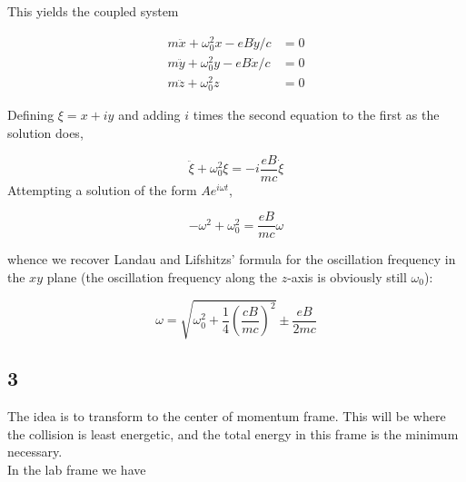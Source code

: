 \documentclass[12pt]{article}
\begin{document}
\noindent This yields the coupled system

\begin{align*}
m\ddot{x} + \omega_0^2x - eB\dot{y}/c &= 0 \\
m\ddot{y} + \omega_0^2y - eB\dot{x}/c &= 0 \\
m\ddot{z} + \omega_0^2z &= 0
\end{align*}

\noindent Defining \(\xi = x + iy\) and adding \(i\) times the second equation to the first as the solution does,

\[\ddot{\xi}+\omega_0^2\xi = -i\frac{eB}{mc}\dot{\xi}
\] 
\noindent Attempting a solution of the form \( Ae^{i\omega t}\),

\[-\omega^2 + \omega_0^2 = \frac{eB}{mc}\omega
\]

\noindent whence we recover Landau and Lifshitzs' formula for the oscillation frequency in the \(xy\) plane (the oscillation frequency along the \(z\)-axis is obviously still \(\omega_0\)):

\[\omega = \sqrt{\omega_0^2 +\frac{1}{4}\left(\frac{cB}{mc}\right)^2} \pm \frac{eB}{2mc}
\]

\pagebreak


\subsection*{3}

\noindent The idea is to transform to the center of momentum frame. This will be where the collision is least energetic, and the total energy in this frame is the minimum necessary. \\

In the lab frame we have
\end{document}
